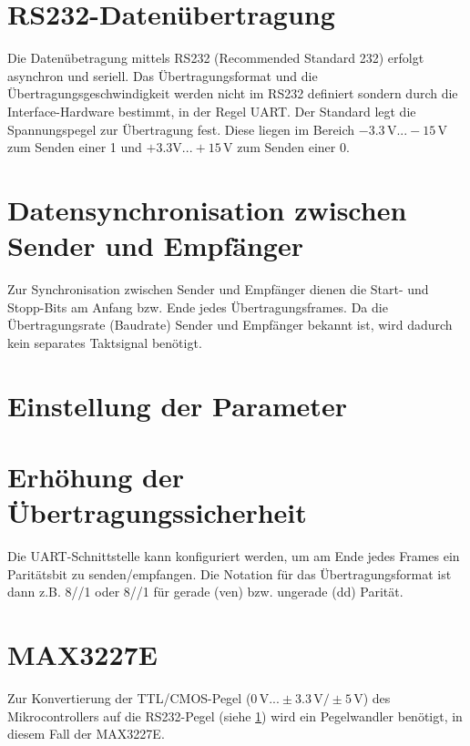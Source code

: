 \documentclass[a4paper, 11pt]{article}
\begin{document}
  
  \clearpage
  \setcounter{page}{1}

  \section{RS232-Datenübertragung}
  \label{sec:1}
  Die Datenübetragung mittels RS232 (Recommended Standard 232) erfolgt asynchron
  und seriell. Das Übertragungsformat und die Übertragungsgeschwindigkeit werden
  nicht im RS232 definiert sondern durch die Interface-Hardware
  bestimmt, in der Regel UART. Der Standard legt die Spannungspegel zur
  Übertragung fest. Diese liegen im Bereich $-3.3 \, \si{\volt} ... -15 \,
  \si{\volt}$ zum Senden einer 1 und $+3.3 \si{\volt} ... +15 \, \si{\volt}$ zum
  Senden einer 0.

  \section{Datensynchronisation zwischen Sender und Empfänger}
  Zur Synchronisation zwischen Sender und Empfänger dienen die Start- und
  Stopp-Bits am Anfang bzw. Ende jedes Übertragungsframes. Da die
  Übertragungsrate (Baudrate) Sender und Empfänger bekannt ist, wird dadurch
  kein separates Taktsignal benötigt.

  \section{Einstellung der Parameter}

  \section{Erhöhung der Übertragungssicherheit}
  Die UART-Schnittstelle kann konfiguriert werden, um am Ende jedes Frames ein
  Paritätsbit zu senden/empfangen. Die Notation für das Übertragungsformat ist
  dann z.B. 8/{\color{cyan5}{E}}/1 oder 8/{\color{orange5}{O}}/1 für gerade ({\color{cyan5}{E}}ven)
  bzw. ungerade ({\color{orange5}{O}}dd) Parität.

  \section{MAX3227E}
  Zur Konvertierung der TTL/CMOS-Pegel ($0 \, \si{\volt}...\pm 3.3 \,
  \si{\volt}/ \pm 5\,\si{\volt}$) des Mikrocontrollers auf die RS232-Pegel
  (siehe \ref{sec:1}) wird ein Pegelwandler benötigt, in diesem Fall der MAX3227E.
  
\end{document}
